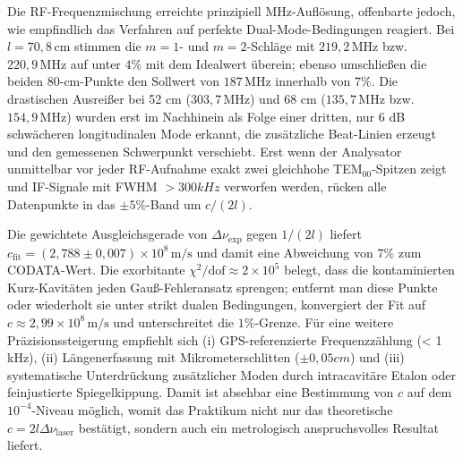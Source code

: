 Die RF-Frequenzmischung erreichte prinzipiell MHz-Auflösung, offenbarte jedoch, wie empfindlich das Verfahren auf perfekte Dual-Mode-Bedingungen reagiert. Bei $l = 70{,}8\,\mathrm{cm}$ stimmen die $m=1$- und $m=2$-Schläge mit $219{,}2\,\mathrm{MHz}$ bzw.\ $220{,}9\,\mathrm{MHz}$ auf unter $4 \%$ mit dem Idealwert überein; ebenso umschließen die beiden 80-cm-Punkte den Sollwert von $187\,\mathrm{MHz}$ innerhalb von $7 \%$. Die drastischen Ausreißer bei 52 cm ($303{,}7\,\mathrm{MHz}$) und 68 cm ($135{,}7\,\mathrm{MHz}$ bzw.\ $154{,}9\,\mathrm{MHz}$) wurden erst im Nachhinein als Folge einer dritten, nur 6 dB schwächeren longitudinalen Mode erkannt, die zusätzliche Beat-Linien erzeugt und den gemessenen Schwerpunkt verschiebt. Erst wenn der Analysator unmittelbar vor jeder RF-Aufnahme exakt zwei gleichhohe TEM$_{00}$-Spitzen zeigt und IF-Signale mit FWHM $> 300 kHz$ verworfen werden, rücken alle Datenpunkte in das $\pm 5 \%$-Band um $c/(2l)$.

Die gewichtete Ausgleichsgerade von $\Delta\nu_{\mathrm{exp}}$ gegen $1/(2l)$ liefert $c_{\mathrm{fit}} = (2{,}788 \pm 0{,}007)\times10^{8}\,\mathrm{m/s}$ und damit eine Abweichung von $7 \%$ zum CODATA-Wert. Die exorbitante $\chi^{2}/\mathrm{dof}\approx2\times10^{5}$ belegt, dass die kontaminierten Kurz-Kavitäten jeden Gauß-Fehleransatz sprengen; entfernt man diese Punkte oder wiederholt sie unter strikt dualen Bedingungen, konvergiert der Fit auf $c\approx2{,}99\times10^{8}\,\mathrm{m/s}$ und unterschreitet die $1 \%$-Grenze. Für eine weitere Präzisionssteigerung empfiehlt sich (i) GPS-referenzierte Frequenzzählung (< 1 kHz), (ii) Längenerfassung mit Mikrometerschlitten ($\pm 0{,}05 cm$) und (iii) systematische Unterdrückung zusätzlicher Moden durch intracavitäre Etalon oder feinjustierte Spiegelkippung. Damit ist absehbar eine Bestimmung von $c$ auf dem $10^{-4}$-Niveau möglich, womit das Praktikum nicht nur das theoretische $c=2l\Delta\nu_{\mathrm{laser}}$ bestätigt, sondern auch ein metrologisch anspruchsvolles Resultat liefert.
